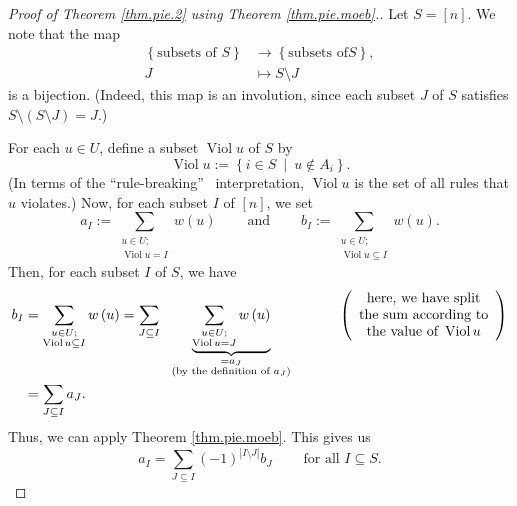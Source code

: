 \begin{proof}
[Proof of Theorem \ref{thm.pie.2} using Theorem \ref{thm.pie.moeb}.]Let
$S=\left[  n\right]  $. We note that the map
\begin{align*}
\left\{  \text{subsets of }S\right\}   &  \rightarrow\left\{  \text{subsets of
}S\right\}  ,\\
J  &  \mapsto S\setminus J
\end{align*}
is a bijection. (Indeed, this map is an involution, since each subset $J$ of
$S$ satisfies $S\setminus\left(  S\setminus J\right)  =J$.)

For each $u\in U$, define a subset $\operatorname*{Viol}u$ of $S$ by%
\[
\operatorname*{Viol}u:=\left\{  i\in S\ \mid\ u\notin A_{i}\right\}  .
\]
(In terms of the \textquotedblleft rule-breaking\textquotedblright%
\ interpretation, $\operatorname*{Viol}u$ is the set of all rules that $u$
violates.) Now, for each subset $I$ of $\left[  n\right]  $, we set%
\[
a_{I}:=\sum_{\substack{u\in U;\\\operatorname*{Viol}u=I}}w\left(  u\right)
\ \ \ \ \ \ \ \ \ \ \text{and}\ \ \ \ \ \ \ \ \ \ b_{I}:=\sum_{\substack{u\in
U;\\\operatorname*{Viol}u\subseteq I}}w\left(  u\right)  .
\]
Then, for each subset $I$ of $S$, we have%
\begin{align*}
b_{I}  &  =\sum_{\substack{u\in U;\\\operatorname*{Viol}u\subseteq I}}w\left(
u\right)  =\sum_{J\subseteq I}\ \ \underbrace{\sum_{\substack{u\in
U;\\\operatorname*{Viol}u=J}}w\left(  u\right)  }_{\substack{=a_{J}\\\text{(by
the definition of }a_{J}\text{)}}}\ \ \ \ \ \ \ \ \ \ \left(
\begin{array}
[c]{c}%
\text{here, we have split}\\
\text{the sum according to}\\
\text{the value of }\operatorname*{Viol}u
\end{array}
\right) \\
&  =\sum_{J\subseteq I}a_{J}.
\end{align*}
Thus, we can apply Theorem \ref{thm.pie.moeb}. This gives us%
\begin{equation}
a_{I}=\sum_{J\subseteq I}\left(  -1\right)  ^{\left\vert I\setminus
J\right\vert }b_{J}\ \ \ \ \ \ \ \ \ \ \text{for all }I\subseteq S.
\label{pf.thm.pie.2.4}%
\end{equation}



\end{proof}
